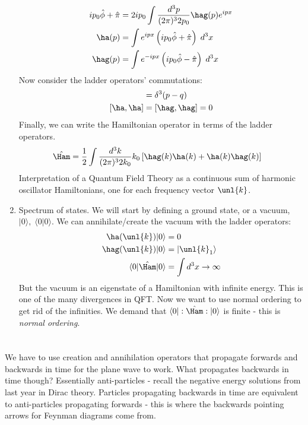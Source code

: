 \documentclass[a4paper, 11pt, normalem]{report}
\newcommand\hphi{\hat{\phi}}
\newcommand\hpi{\hat{\pi}}
\begin{document}
\begin{enumerate}
\begin{align}
            ip_0\hphi + \hpi &= 2ip_0 \int\frac{d^3p}{(2\pi)^32p_0} \hag(p)e^{ipx} \\
            \ha(p) &= \int e^{ipx}\left(ip_0\hphi + \hpi\right)\;d^3x \\
            \hag(p) &= \int e^{-ipx}\left(ip_0\hphi - \hpi\right)\;d^3x
        \end{align}
        Now consider the ladder operators' commutations:
        \begin{align}
            [\ha(p),\hag(q)] &= \delta^3(p-q) \\
            [\ha,\ha] &= [\hag,\hag] = 0
        \end{align}
        Finally, we can write the Hamiltonian operator in terms of the ladder operators. 
        \begin{align}
            \hat{\Ham} &= \frac12 \int \frac{d^3k}{(2\pi)^32k_0} k_0\left[\hag(k)\ha(k) + \ha(k)\hag(k)\right]
        \end{align}
        Interpretation of a Quantum Field Theory as a continuous sum of harmonic oscillator Hamiltonians, one for each frequency vector $\unl{k}$.
    \item Spectrum of states. 
        We will start by defining a ground state, or a vacuum, $|0\rangle,\;\langle0|0\rangle$.
        We can annihilate/create the vacuum with the ladder operators:
        \begin{align}
            \ha(\unl{k})|0\rangle &= 0 \\
            \hag(\unl{k})|0\rangle &= |\unl{k}_1\rangle \\
            \langle0|\hat{\Ham}|0\rangle &= \int d^3x \to \infty
        \end{align}
        But the vacuum is an eigenstate of a Hamiltonian with infinite energy. 
        This is one of the many divergences in QFT.
        Now we want to use normal ordering to get rid of the infinities. 
        We demand that $\langle0|:\hat{\Ham}:|0\rangle$ is finite - this is \textit{normal ordering}. 
\end{enumerate}


\chapter{}
We have to use creation and annihilation operators that propagate forwards and backwards in time for the plane wave to work. 
What propagates backwards in time though?
Essentially anti-particles - recall the negative energy solutions from last year in Dirac theory. 
Particles propagating backwards in time are equivalent to anti-particles propagating forwards - this is where the backwards pointing arrows for Feynman diagrams come from. 
\end{document}
